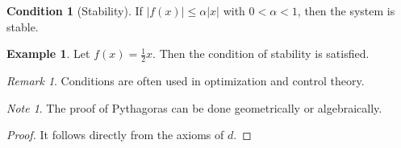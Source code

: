 \documentclass[onecolumn]{article}
\theoremstyle{definition}
\newtheorem{condition}[theorem]{Condition}
\newtheorem{example}[theorem]{Example}
\theoremstyle{remark}
\newtheorem*{remark}{Remark}
\newtheorem*{note}{Note}
\begin{document}
\begin{condition}[Stability] %
\label{cond:stability}
If $|f(x)| \leq \alpha|x|$ with $0<\alpha<1$, then the system is stable.
\end{condition}

\begin{example} %
\label{ex:stability}
Let $f(x)=\tfrac{1}{2}x$. Then the condition of stability is satisfied.
\end{example}

\begin{remark} %
\label{rem:control}
Conditions are often used in optimization and control theory.
\end{remark}

\begin{note} %
\label{note:pythagoras}
The proof of Pythagoras can be done geometrically or algebraically.
\end{note}

\begin{proof} %
It follows directly from the axioms of $d$. 
\end{proof}










\end{document}

